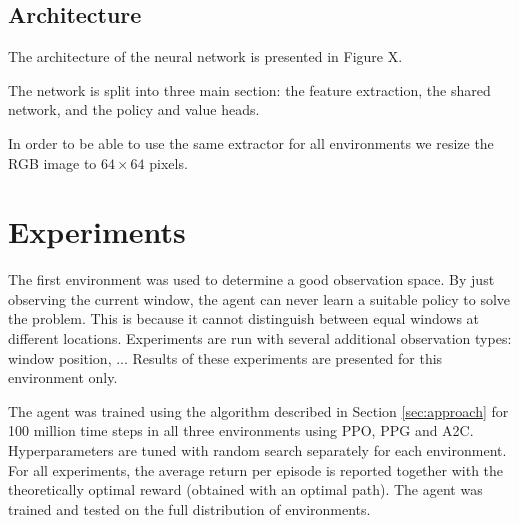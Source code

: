 
\subsection{Architecture}



The architecture of the neural network is presented in Figure X.

The network is split into three main section: the feature extraction, the shared network, and the policy and value heads.

In order to be able to use the same extractor for all environments we resize the RGB image to \(64 \times 64\) pixels.





\section{Experiments}
\label{sec:experiments}

The first environment was used to determine a good observation space.
By just observing the current window, the agent can never learn a suitable policy to solve the problem.
This is because it cannot distinguish between equal windows at different locations.
Experiments are run with several additional observation types: window position, ...
Results of these experiments are presented for this environment only.

The agent was trained using the algorithm described in Section \ref{sec:approach} for 100 million time steps in all three environments using PPO, PPG and A2C.
Hyperparameters are tuned with random search separately for each environment.
For all experiments, the average return per episode is reported together with the theoretically optimal reward (obtained with an optimal path).
The agent was trained and tested on the full distribution of environments.

